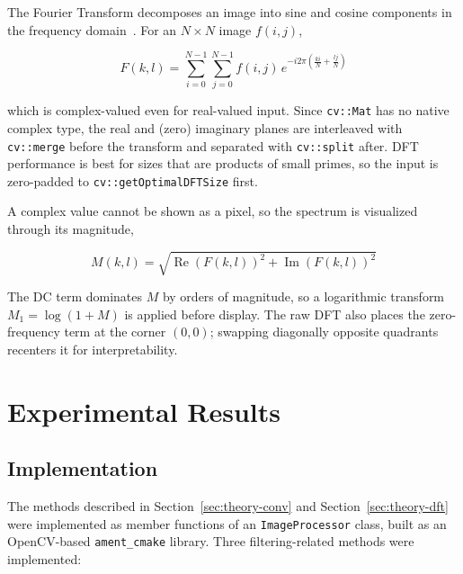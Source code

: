 \documentclass[conference]{IEEEtran}
\begin{document}
The Fourier Transform decomposes an image into sine and cosine
components in the frequency domain~\cite{opencv-dft}. For an
$N \times N$ image $f(i,j)$,

\begin{equation}
    F(k, l) = \sum_{i=0}^{N-1} \sum_{j=0}^{N-1}
    f(i, j)\, e^{-i 2\pi \left(\frac{ki}{N} + \frac{lj}{N}\right)}
    \label{eq:dft}
\end{equation}

\noindent which is complex-valued even for real-valued input. Since
\texttt{cv::Mat} has no native complex type, the real and (zero)
imaginary planes are interleaved with \texttt{cv::merge} before the
transform and separated with \texttt{cv::split} after. DFT
performance is best for sizes that are products of small primes, so
the input is zero-padded to \texttt{cv::getOptimalDFTSize} first.

A complex value cannot be shown as a pixel, so the spectrum is
visualized through its magnitude,

\begin{equation}
    M(k, l) = \sqrt{\operatorname{Re}(F(k,l))^2 + \operatorname{Im}(F(k,l))^2}
    \label{eq:magnitude}
\end{equation}

\noindent The DC term dominates $M$ by orders of magnitude, so a
logarithmic transform $M_1 = \log(1 + M)$ is applied before display.
The raw DFT also places the zero-frequency term at the corner
$(0,0)$; swapping diagonally opposite quadrants recenters it for
interpretability.

\section{Experimental Results}
\label{sec:experiments}

\subsection{Implementation}
The methods described in Section~\ref{sec:theory-conv} and
Section~\ref{sec:theory-dft} were implemented as member functions of
an \texttt{ImageProcessor} class, built as an OpenCV-based
\texttt{ament\_cmake} library. Three filtering-related methods were
implemented:
\end{document}
